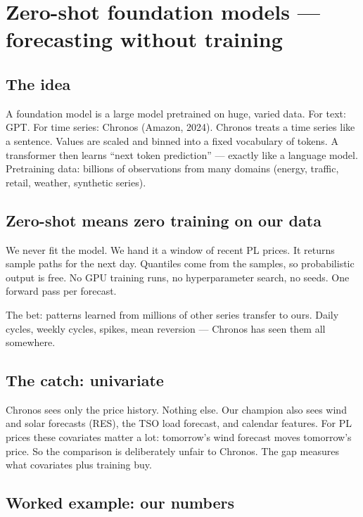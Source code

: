 \section{Zero-shot foundation models --- forecasting without training}

\subsection{The idea}

A foundation model is a large model pretrained on huge, varied data.
For text: GPT. For time series: Chronos (Amazon, 2024).
Chronos treats a time series like a sentence. Values are scaled and
binned into a fixed vocabulary of tokens. A transformer then learns
``next token prediction'' --- exactly like a language model.
Pretraining data: billions of observations from many domains
(energy, traffic, retail, weather, synthetic series).

\subsection{Zero-shot means zero training on our data}

We never fit the model. We hand it a window of recent PL prices.
It returns sample paths for the next day. Quantiles come from the
samples, so probabilistic output is free. No GPU training runs,
no hyperparameter search, no seeds. One forward pass per forecast.

The bet: patterns learned from millions of other series transfer
to ours. Daily cycles, weekly cycles, spikes, mean reversion ---
Chronos has seen them all somewhere.

\subsection{The catch: univariate}

Chronos sees only the price history. Nothing else.
Our champion also sees wind and solar forecasts (RES), the TSO load
forecast, and calendar features. For PL prices these covariates
matter a lot: tomorrow's wind forecast moves tomorrow's price.
So the comparison is deliberately unfair to Chronos.
The gap measures what covariates plus training buy.

\subsection{Worked example: our numbers}


